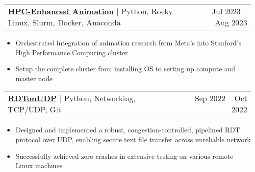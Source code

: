 \documentclass[letterpaper,11pt]{article}
\makeatletter
\newcommand{\resumeItem}[1]{
  \item\small{
    {#1 \vspace{-2.5pt}}
  }
}
\newcommand{\resumeProjectHeading}[2]{
    \item
    \begin{tabular*}{0.97\textwidth}{l@{\extracolsep{\fill}}r}
      \small#1 & \footnotesize#2 \\
    \end{tabular*}\vspace{-7pt}
}
\newcommand{\resumeItemListStart}{\begin{itemize}}
\newcommand{\resumeItemListEnd}{\end{itemize}\vspace{-5pt}}
\makeatother
\begin{document}
    

        
        \resumeProjectHeading
    {\textbf{{\href{https://github.com/Usgupta/AnimatedDrawings}{{\faLink} HPC-Enhanced Animation}}} $|$  Python, Rocky Linux, Slurm, Docker, Anaconda }{Jul 2023 --  Aug 2023}
           \resumeItemListStart
            \resumeItem{Orchestrated integration of animation research from Meta's into Stanford's High Performance Computing cluster}
             \resumeItem{Setup the complete cluster from installing OS to setting up compute and master node}
          \resumeItemListEnd
          
        \resumeProjectHeading
        {\textbf{{\href{https://github.com/Usgupta/RDTonUDP}{{\faLink} RDTonUDP}}} $|$ {Python, Networking, TCP/UDP, Git}}{Sep 2022 -- Oct 2022}
          \resumeItemListStart
            \resumeItem{Designed and implemented a robust, congestion-controlled, pipelined RDT protocol over UDP, enabling secure text file transfer across unreliable network}
            \resumeItem{Successfully achieved zero crashes in extensive testing on various remote Linux machines}
    
          \resumeItemListEnd
\end{document}
